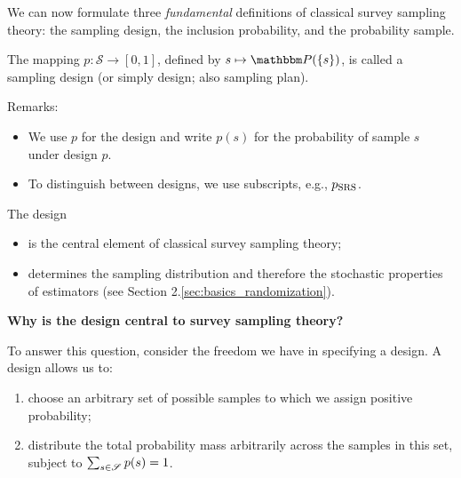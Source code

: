 \documentclass{my_eth_beamer}
\numberwithin{equation}{section}
\begin{document}
\begin{frame}
    We can now formulate three \emph{fundamental} definitions of classical
    survey sampling theory: the sampling design, the inclusion probability,
    and the probability sample.

    \vspace{1em}
    \begin{Def}\label{def:design}
        \vspace{-0.5em}
        The mapping $p:\mathscr{S} \rightarrow [0,1]$, defined by
        $s \mapsto \PP(\{s\})$, is called a \alert{sampling design}
        (or simply design; also sampling plan).
    \end{Def}
    \vspace{0.75em}
    Remarks:
    \vspace{0.25em}
    \begin{itemize}
    \setlength{\itemsep}{8pt}
        \item We use $p$ for the design and write $p(s)$ for the probability
            of sample $s$ under design $p$.
        \item To distinguish between designs, we use subscripts, e.g.,
            $p_{\mathrm{SRS}}$.
    \end{itemize}
\end{frame}

\begin{frame}
    The \alert{design}
    \vspace{0.25em}
    \begin{itemize}
    \setlength{\itemsep}{8pt}
        \item is the \alert{central element} of classical survey sampling
            theory;
        \item determines the \alert{sampling distribution} and therefore the
            stochastic properties of estimators (see Section
            2.\ref{sec:basics_randomization}).
    \end{itemize}

    \vspace{1.25em}

    \textcolor{fhnwblue}{\bfseries Why is the design central to survey
    sampling theory?}

    \vspace{0.25em}

    To answer this question, consider the \alert{freedom} we have in
    specifying a design. A design allows us to:
    \vspace{0.25em}
    \begin{enumerate}
    \setlength{\itemsep}{8pt}
        \item choose an \alert{arbitrary} set of possible samples to which
            we assign positive probability;
        \item distribute the total probability mass \alert{arbitrarily}
            across the samples in this set, subject to $\sum_{s \in
            \mathscr{S}} p(s) = 1$.
    \end{enumerate}
\end{frame}
\end{document}

